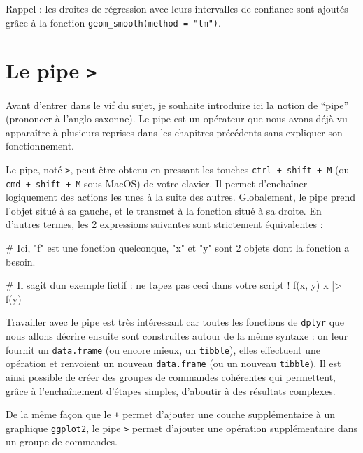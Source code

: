 \documentclass[
  a4paper,
  DIV=11,
  numbers=noendperiod,
  oneside]{scrreprt}
\newenvironment{Shaded}{}{}
\newcommand{\CommentTok}[1]{\textcolor[rgb]{0.42,0.45,0.49}{#1}}
\newcommand{\FunctionTok}[1]{\textcolor[rgb]{0.44,0.26,0.76}{#1}}
\newcommand{\NormalTok}[1]{\textcolor[rgb]{0.14,0.16,0.18}{#1}}
\newcommand{\SpecialCharTok}[1]{\textcolor[rgb]{0.00,0.36,0.77}{#1}}
\begin{document}
Rappel : les droites de régression avec leurs intervalles de confiance
sont ajoutés grâce à la fonction \texttt{geom\_smooth(method\ =\ "lm")}.

\section{\texorpdfstring{Le pipe
\texttt{\textbar{}\textgreater{}}}{Le pipe \textbar\textgreater{}}}\label{le-pipe}

Avant d'entrer dans le vif du sujet, je souhaite introduire ici la
notion de ``pipe'' (prononcer à l'anglo-saxonne). Le pipe est un
opérateur que nous avons déjà vu apparaître à plusieurs reprises dans
les chapitres précédents sans expliquer son fonctionnement.

Le pipe, noté \texttt{\textbar{}\textgreater{}}, peut être obtenu en
pressant les touches \texttt{ctrl\ +\ shift\ +\ M} (ou
\texttt{cmd\ +\ shift\ +\ M} sous MacOS) de votre clavier. Il permet
d'enchaîner logiquement des actions les unes à la suite des autres.
Globalement, le pipe prend l'objet situé à sa gauche, et le transmet à
la fonction situé à sa droite. En d'autres termes, les 2 expressions
suivantes sont strictement équivalentes :

\begin{Shaded}
\begin{Highlighting}[]
\CommentTok{\# Ici, "f" est une fonction quelconque, "x" et "y" sont 2 objets dont la fonction a besoin.}

\CommentTok{\# Il s\textquotesingle{}agit d\textquotesingle{}un exemple fictif : ne tapez pas ceci dans votre script !}
\FunctionTok{f}\NormalTok{(x, y)}
\NormalTok{x }\SpecialCharTok{|\textgreater{}} \FunctionTok{f}\NormalTok{(y)}
\end{Highlighting}
\end{Shaded}

Travailler avec le pipe est très intéressant car toutes les fonctions de
\texttt{dplyr} que nous allons décrire ensuite sont construites autour
de la même syntaxe : on leur fournit un \texttt{data.frame} (ou encore
mieux, un \texttt{tibble}), elles effectuent une opération et renvoient
un nouveau \texttt{data.frame} (ou un nouveau \texttt{tibble}). Il est
ainsi possible de créer des groupes de commandes cohérentes qui
permettent, grâce à l'enchaînement d'étapes simples, d'aboutir à des
résultats complexes.

De la même façon que le \texttt{+} permet d'ajouter une couche
supplémentaire à un graphique \texttt{ggplot2}, le pipe
\texttt{\textbar{}\textgreater{}} permet d'ajouter une opération
supplémentaire dans un groupe de commandes.
\end{document}
